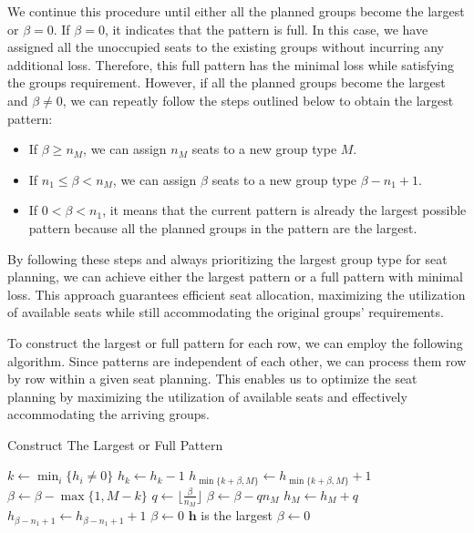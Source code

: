 We continue this procedure until either all the planned groups become the largest or $\beta = 0$. If $\beta = 0$, it indicates that the pattern is full. In this case, we have assigned all the unoccupied seats to the existing groups without incurring any additional loss. Therefore, this full pattern has the minimal loss while satisfying the groups requirement. However, if all the planned groups become the largest and $\beta \neq 0$, we can repeatly follow the steps outlined below to obtain the largest pattern:

\begin{itemize}
    \item If $\beta \geq n_{M}$, we can assign $n_M$ seats to a new group type $M$.
  
    \item If $n_{1} \leq \beta < n_{M}$, we can assign $\beta$ seats to a new group type $\beta-n_{1}+1$.
    \item If $0 < \beta < n_{1}$, it means that the current pattern is already the largest possible pattern because all the planned groups in the pattern are the largest.
  \end{itemize}
  
By following these steps and always prioritizing the largest group type for seat planning, we can achieve either the largest pattern or a full pattern with minimal loss. This approach guarantees efficient seat allocation, maximizing the utilization of available seats while still accommodating the original groups' requirements.


To construct the largest or full pattern for each row, we can employ the following algorithm. Since patterns are independent of each other, we can process them row by row within a given seat planning. This enables us to optimize the seat planning by maximizing the utilization of available seats and effectively accommodating the arriving groups.

\begin{algorithm}
    \caption{Construct The Largest or Full Pattern}\label{construction}
      {$k \gets \min_{i}\{h_{i} \neq 0\}$
      {$h_{k} \gets h_{k} - 1$\; $h_{\min\{k+\beta, M\}} \gets h_{\min\{k+\beta, M\}} + 1$\;
      $\beta \gets \beta - \max\{1, M - k\}$}
      {
      {$q \gets \lfloor\frac{\beta}{n_M}\rfloor$\;
       $\beta \gets \beta - q n_M$\; $h_{M} \gets h_{M} + q$}
      {
      {$h_{\beta-n_1+1} \gets h_{\beta-n_1+1} + 1$\; $\beta \gets 0$\;}
      {$\bm{h}$ is the largest\; $\beta \gets 0$\;}}
      }}
  \end{algorithm}

